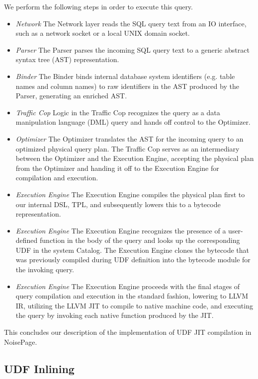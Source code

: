 \documentclass{vldb}
\begin{document}
We perform the following steps in order to execute this query.

\begin{itemize}
    \item \textit{Network} The Network layer reads the SQL query text from an IO interface, such as a network socket or a local UNIX domain socket.
    \item \textit{Parser} The Parser parses the incoming SQL query text to a generic abstract syntax tree (AST) representation.
    \item \textit{Binder} The Binder binds internal database system identifiers (e.g. table names and column names) to raw identifiers in the AST produced by the Parser, generating an enriched AST.
    \item \textit{Traffic Cop} Logic in the Traffic Cop recognizes the query as a data manipulation language (DML) query and hands off control to the Optimizer.
    \item \textit{Optimizer} The Optimizer translates the AST for the incoming query to an optimized physical query plan. The Traffic Cop serves as an intermediary between the Optimizer and the Execution Engine, accepting the physical plan from the Optimizer and handing it off to the Execution Engine for compilation and execution.
    \item \textit{Execution Engine} The Execution Engine compiles the physical plan first to our internal DSL, TPL, and subsequently lowers this to a bytecode representation.
    \item \textit{Execution Engine} The Execution Engine recognizes the presence of a user-defined function in the body of the query and looks up the corresponding UDF in the system Catalog. The Execution Engine clones the bytecode that was previously compiled during UDF definition into the bytecode module for the invoking query.
    \item \textit{Execution Engine} The Execution Engine proceeds with the final stages of query compilation and execution in the standard fashion, lowering to LLVM IR, utilizing the LLVM JIT to compile to native machine code, and executing the query by invoking each native function produced by the JIT.
\end{itemize}

This concludes our description of the implementation of UDF JIT compilation in NoisePage.

\subsection{UDF Inlining}
\end{document}
